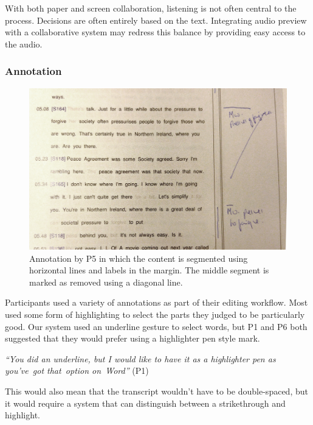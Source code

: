 With both paper and screen collaboration, listening is not often central to the process. Decisions are often entirely
based on the text. Integrating audio preview with a collaborative system may redress this balance by providing easy
access to the audio.

\subsubsection{Annotation}


\begin{figure}[h]
  \centering
  \includegraphics[width=\columnwidth]{figs/pen-annotations-p5-cropped.jpg}
  \caption{Annotation by P5 in which the content is segmented using horizontal lines and labels in the margin. The
  middle segment is marked as removed using a diagonal line.}
  \label{fig:p5-annotations}
\end{figure}


Participants used a variety of annotations as part of their editing workflow. Most used some form of highlighting to
select the parts they judged to be particularly good. Our system used an underline gesture to select words, but P1 and
P6 both suggested that they would prefer using a highlighter pen style mark.

\textit{``You did an underline, but I would like to have it as a highlighter pen as you've got that option on Word''}
(P1)

This would also mean that the transcript wouldn't have to be double-spaced, but it would require a system that can
distinguish between a strikethrough and highlight.

